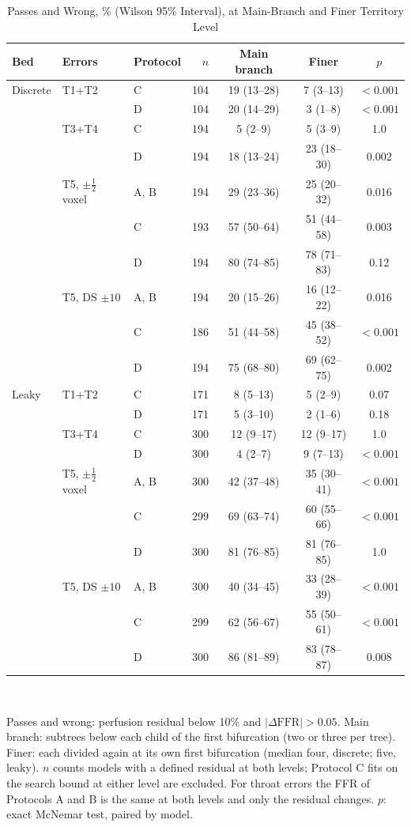 \documentclass[journal,twoside,web,onecolumn]{ieeecolor}
\begin{document}
\begin{table}[!ht]
\caption{Passes and Wrong, \% (Wilson 95\% Interval), at Main-Branch and Finer Territory Level}\label{tab:gran}
\centering\small
\begin{tabular}{@{}lllrccc@{}}
\toprule
Bed & Errors & Protocol & $n$ & Main branch & Finer & $p$\\
\midrule
Discrete & T1+T2 & C & 104 & 19 (13--28) & 7 (3--13) & $<0.001$ \\
 & & D & 104 & 20 (14--29) & 3 (1--8) & $<0.001$ \\
 & T3+T4 & C & 194 & 5 (2--9) & 5 (3--9) & 1.0 \\
 & & D & 194 & 18 (13--24) & 23 (18--30) & 0.002 \\
 & T5, $\pm\tfrac12$ voxel & A, B & 194 & 29 (23--36) & 25 (20--32) & 0.016 \\
 & & C & 193 & 57 (50--64) & 51 (44--58) & 0.003 \\
 & & D & 194 & 80 (74--85) & 78 (71--83) & 0.12 \\
 & T5, DS $\pm10$ & A, B & 194 & 20 (15--26) & 16 (12--22) & 0.016 \\
 & & C & 186 & 51 (44--58) & 45 (38--52) & $<0.001$ \\
 & & D & 194 & 75 (68--80) & 69 (62--75) & 0.002 \\
\addlinespace[2pt]
Leaky & T1+T2 & C & 171 & 8 (5--13) & 5 (2--9) & 0.07 \\
 & & D & 171 & 5 (3--10) & 2 (1--6) & 0.18 \\
 & T3+T4 & C & 300 & 12 (9--17) & 12 (9--17) & 1.0 \\
 & & D & 300 & 4 (2--7) & 9 (7--13) & $<0.001$ \\
 & T5, $\pm\tfrac12$ voxel & A, B & 300 & 42 (37--48) & 35 (30--41) & $<0.001$ \\
 & & C & 299 & 69 (63--74) & 60 (55--66) & $<0.001$ \\
 & & D & 300 & 81 (76--85) & 81 (76--85) & 1.0 \\
 & T5, DS $\pm10$ & A, B & 300 & 40 (34--45) & 33 (28--39) & $<0.001$ \\
 & & C & 299 & 62 (56--67) & 55 (50--61) & $<0.001$ \\
 & & D & 300 & 86 (81--89) & 83 (78--87) & 0.008 \\
\bottomrule
\end{tabular}
\\[3pt]
\parbox{0.85\textwidth}{\footnotesize Passes and wrong: perfusion residual below 10\% and $|\Delta\mathrm{FFR}| > 0.05$. Main branch: subtrees below each child of the first bifurcation (two or three per tree). Finer: each divided again at its own first bifurcation (median four, discrete; five, leaky). $n$ counts models with a defined residual at both levels; Protocol C fits on the search bound at either level are excluded. For throat errors the FFR of Protocols A and B is the same at both levels and only the residual changes. $p$: exact McNemar test, paired by model.}
\end{table}
\end{document}
